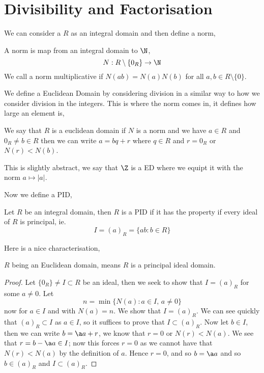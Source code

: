 
\section{Divisibility and Factorisation}

We can consider a $R$ as an integral domain and then define a norm,
\begin{ndefi}[Norm]
  A norm is map from an integral domain to $\N$,
  $$ N : R\setminus \{0_R\} \to \N $$
  We call a norm multiplicative if $N(ab) = N(a)N(b)$ for all $a, b \in R\setminus \{0\}$.
\end{ndefi}

\noindent
We define a Euclidean Domain by considering division in a similar way to how we consider division in the integers. This is where the norm comes in, it defines how large an element is,
\begin{ndefi}
  We say that $R$ is a euclidean domain if $N$ is a norm and we have $a \in R$ and $0_R \ne b \in R$ then we can write $a = bq + r$ where $q \in R$ and $r = 0_R$ or $N(r) < N(b)$.
\end{ndefi}

This is slightly abstract, we say that $\Z$ is a ED where we equipt it with the norm $a \mapsto |a|$.

\noindent
Now we define a PID,
\begin{ndefi}
  Let $R$ be an integral domain, then $R$ is a PID if it has the property if every ideal of $R$ is principal, ie.
  $$ I = (a)_R = \{ab : b \in R\} $$
\end{ndefi}
Here is a nice characterisation,

\begin{nthm}
  $R$ being an Euclidean domain, means $R$ is a principal ideal domain.
\end{nthm}
\begin{proof}
  Let $\{0_R\} \ne I \subset R$ be an ideal, then we seek to show that $I = (a)_R$ for some $a \ne 0$. Let
  $$ n = \min\{N(a) : a \in I,\, a \ne 0\} $$
  now for $a \in I$ and with $N(a) = n$. We show that $I = (a)_R$. We can see quickly that $(a)_R \subset I$ as $a \in I$, so it suffices to prove that $I \subset (a)_R$. Now let $b \in I$, then we can write $b = \a a + r$, we know that $r = 0$ or $N(r) < N(a)$. We see that $r = b - \a a \in I$; now this forces $r = 0$ as we cannot have that $N(r) < N(a)$ by the definition of $a$. Hence $r = 0$, and so $b = \a a$ and so $b \in (a)_R$ and $I \subset (a)_R$.
\end{proof}


